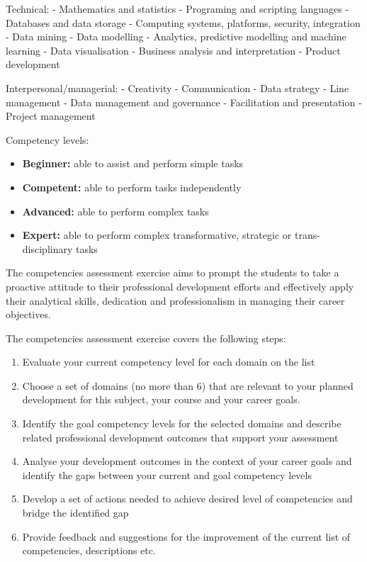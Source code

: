 \documentclass[]{book}
\providecommand{\tightlist}{%
  \setlength{\itemsep}{0pt}\setlength{\parskip}{0pt}}
\theoremstyle{definition}
\theoremstyle{definition}
\theoremstyle{remark}
\begin{document}
Technical: - Mathematics and statistics - Programing and scripting
languages - Databases and data storage - Computing systems, platforms,
security, integration - Data mining - Data modelling - Analytics,
predictive modelling and machine learning - Data visualisation -
Business analysis and interpretation - Product development

Interpersonal/managerial: - Creativity - Communication - Data strategy -
Line management - Data management and governance - Facilitation and
presentation - Project management

Competency levels:

\begin{itemize}
\tightlist
\item
  \textbf{Beginner:} able to assist and perform simple tasks
\item
  \textbf{Competent:} able to perform tasks independently
\item
  \textbf{Advanced:} able to perform complex tasks
\item
  \textbf{Expert:} able to perform complex transformative, strategic or
  trans-disciplinary tasks
\end{itemize}

The competencies assessment exercise aims to prompt the students to take
a proactive attitude to their professional development efforts and
effectively apply their analytical skills, dedication and
professionalism in managing their career objectives.

The competencies assessment exercise covers the following steps:

\begin{enumerate}
\def\labelenumi{\arabic{enumi}.}
\tightlist
\item
  Evaluate your current competency level for each domain on the list
\item
  Choose a set of domains (no more than 6) that are relevant to your
  planned development for this subject, your course and your career
  goals.
\item
  Identify the goal competency levels for the selected domains and
  describe related professional development outcomes that support your
  assessment
\item
  Analyse your development outcomes in the context of your career goals
  and identify the gaps between your current and goal competency levels
\item
  Develop a set of actions needed to achieve desired level of
  competencies and bridge the identified gap
\item
  Provide feedback and suggestions for the improvement of the current
  list of competencies, descriptions etc.
\end{enumerate}
\end{document}
